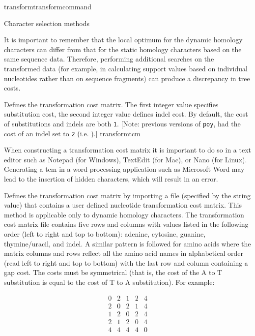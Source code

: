 \begin{command}{transform}{transformcommand}
\begin{arguments}
\begin{argumentgroup}{Character selection methods}
\begin{statement}
It is important to remember that the local optimum for the dynamic homology
characters can differ from that for the static homology characters based on the
same sequence data. Therefore, performing additional searches on the transformed
data (for example, in calculating support values based on individual nucleotides
rather than on sequence fragments) can produce a discrepancy in tree costs.
\end{statement}

{Defines the transformation cost matrix. The first integer value specifies
substitution cost, the second integer value defines indel cost. By default,
the cost of substitutions and indels are both \texttt{1}. 
[Note: previous versions of \texttt{poy}, had the cost of an indel set to 
\texttt{2} (i.e. ).]}
{transformtcm}

\begin{statement}
When constructing a transformation cost matrix it is important to do so in a text editor 
such as Notepad (for Windows), TextEdit (for Mac), or Nano (for Linux). Generating a tcm in 
a word processing application such as Microsoft Word may lead to the insertion of hidden 
characters, which will result in an error.
\end{statement}

{Defines the transformation cost matrix by importing a file (specified by
the string value) that contains a user defined nucleotide
transformation cost matrix. This method is applicable only to dynamic homology characters.
The transformation cost matrix file contains five rows and columns
with values listed in the following order (left to right and top to
bottom): adenine, cytosine, guanine,
thymine/uracil, and indel. A similar pattern is followed for amino acids
where the matrix columns and rows reflect all the amino acid names in alphabetical order
(read left to right and top to bottom) with the last row and column containing a gap cost. 
The costs must be symmetrical (that is, the
cost of the A to T substitution is equal to the cost of T to A
substitution). For example:

\begin{equation*}
\begin{array}{lllll}
0 &   2 &  1 &   2 &   4 \\
2 &   0 &  2 &   1 &   4 \\
1 &   2 &  0 &   2 &   4 \\
2 &   1 &  2 &   0 &   4 \\
4 &   4 &  4 &   4 &   0
\end{array}
\end{equation*} 

}
\end{argumentgroup}
\end{arguments}
\end{command}

